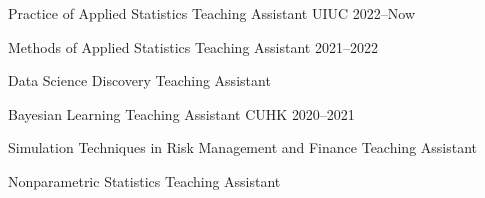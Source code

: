 


\begin{cvhonors}

  \cvhonor
    {Practice of Applied Statistics} %
    {Teaching Assistant} %
    {UIUC} %
    {2022--Now} %

  \cvhonor
    {Methods of Applied Statistics} %
    {Teaching Assistant} %
    {} %
    {2021--2022} %

  \cvhonor
    {Data Science Discovery} %
    {Teaching Assistant} %
    {} %
    {} %

  \cvhonor
    {Bayesian Learning} %
    {Teaching Assistant} %
    {CUHK} %
    {2020--2021} %

  \cvhonor
    {Simulation Techniques in Risk Management and Finance} %
    {Teaching Assistant} %
    {} %
    {} %

  \cvhonor
    {Nonparametric Statistics} %
    {Teaching Assistant} %
    {} %
    {} %

\end{cvhonors}

